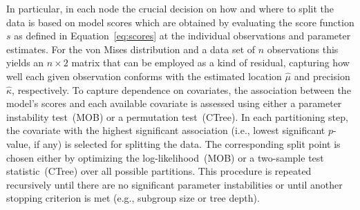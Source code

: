 \documentclass[nojss]{jss}
\numberwithin{equation}{section}
\begin{document}
In particular, in each node the crucial decision on how and where to split the data is based on model
scores which are obtained by evaluating the score function $s$ as defined in Equation~\ref{eq:scores} 
at the individual observations and parameter estimates. For the von Mises distribution and a data set 
of $n$ observations this yields an $n \times 2$ matrix that can be employed as a kind of residual,
capturing how well each given observation conforms with the estimated location $\hat{\mu}$ and precision
$\hat{\kappa}$, respectively.
To capture dependence on covariates, the association between the model's scores and each available
covariate is assessed using either a parameter instability test~(MOB) or a permutation test~(CTree).
In each partitioning step, the covariate with the highest significant association (i.e., lowest
significant $p$-value, if any) is selected for splitting the data. The corresponding split point
is chosen either by optimizing the log-likelihood~(MOB) or a two-sample test statistic~(CTree)
over all possible partitions.
This procedure is repeated recursively until there are no significant parameter instabilities or until another stopping criterion is met (e.g., subgroup size or tree depth).

\end{document}
